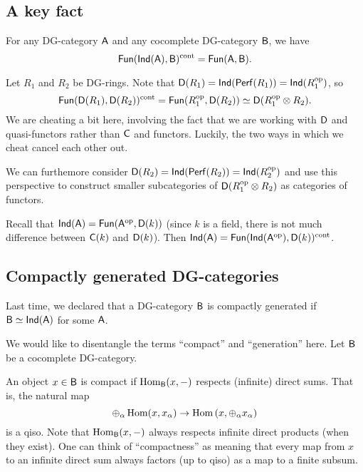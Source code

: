\documentclass{amsart}
\begin{document}
\subsection{A key fact}

For any DG-category $\mathsf{A}$ and any cocomplete DG-category $\mathsf{B}$, we have
\[
	\mathsf{Fun}(\mathsf{Ind}(\mathsf{A}), \mathsf{B})^{\mathrm{cont}} = \mathsf{Fun}(\mathsf{A}, \mathsf{B}).
\]

\begin{ex}
	Let $R_1$ and $R_2$ be DG-rings.
	Note that $\mathsf{D}(R_1) = \mathsf{Ind}(\mathsf{Perf}(R_1)) = \mathsf{Ind}(R_1^{\mathrm{op}})$, so
	\[
		\mathsf{Fun}(\mathsf{D}(R_1), \mathsf{D}(R_2))^{\mathrm{cont}} = \mathsf{Fun}(R_1^{\mathrm{op}}, \mathsf{D}(R_2)) \simeq \mathsf{D}(R_1^{\mathrm{op}} \otimes R_2).
	\]
	We are cheating a bit here, involving the fact that we are working with $\mathsf{D}$ and quasi-functors rather than $\mathsf{C}$ and functors.
	Luckily, the two ways in which we cheat cancel each other out.

	We can furthemore consider $\mathsf{D}(R_2) = \mathsf{Ind}(\mathsf{Perf}(R_2)) = \mathsf{Ind}(R_2^{\mathrm{op}})$ and use this perspective to construct smaller subcategories of $\mathsf{D}(R_1^{\mathrm{op}} \otimes R_2)$ as categories of functors.
\end{ex}

\begin{ex}
	Recall that $\mathsf{Ind}(\mathsf{A}) = \mathsf{Fun}(\mathsf{A}^{\mathrm{op}}, \mathsf{D}(k))$ (since $k$ is a field, there is not much difference between $\mathsf{C}(k)$ and $\mathsf{D}(k)$).
	Then $\mathsf{Ind}(\mathsf{A}) = \mathsf{Fun}(\mathsf{Ind}(\mathsf{A}^{\mathrm{op}}), \mathsf{D}(k))^{\mathrm{cont}}$.
\end{ex}

\subsection{Compactly generated DG-categories}

Last time, we declared that a DG-category $\mathsf{B}$ is compactly generated if $\mathsf{B} \simeq \mathsf{Ind}(\mathsf{A})$ for some $\mathsf{A}$.

We would like to disentangle the terms ``compact'' and ``generation'' here.
Let $\mathsf{B}$ be a cocomplete DG-category.

\begin{dfn}
	An object $x \in \mathsf{B}$ is compact if $\operatorname{Hom}_{\mathsf{B}}(x, -)$ respects (infinite) direct sums.
	That is, the natural map
	\[
		\oplus_\alpha \operatorname{Hom}(x, x_\alpha) \to \operatorname{Hom}\left(x, \oplus_\alpha x_\alpha\right)
	\]
	is a qiso.
	Note that $\operatorname{Hom}_{\mathsf{B}}(x, -)$ always respects infinite direct products (when they exist).
	One can think of ``compactness'' as meaning that every map from $x$ to an infinite direct sum always factors (up to qiso) as a map to a finite subsum.
\end{dfn}
\end{document}
